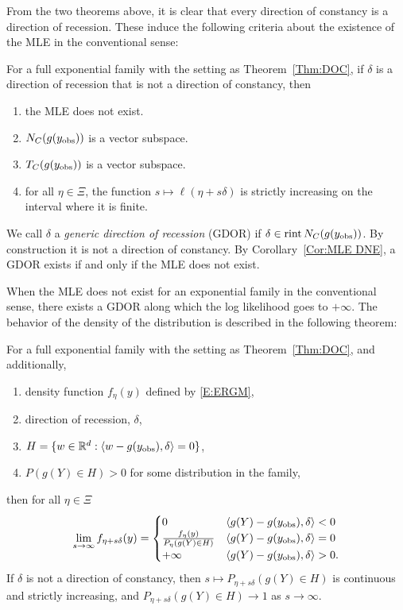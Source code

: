 From the two theorems above, it is clear that every direction of constancy is a 
direction of recession.  These induce the following criteria about the existence of 
the MLE in the conventional sense:

\begin{corollary} \label{Cor:MLE DNE}
For a full exponential family with the setting as Theorem~\ref{Thm:DOC}, if $\delta$ 
is a 
direction of recession that is not a direction of constancy, then  
\begin{enumerate}
\item the MLE does not exist.
\item $N_C(g(y_{\textrm{obs}}))$ is a vector subspace.
\item $T_C(g(y_{\textrm{obs}}))$ is a vector subspace.
\item for all $\eta \in \Xi$, the function $s \mapsto \ell(\eta + s \delta)$ is 
strictly increasing on 
the interval where it is finite.
\end{enumerate}
\end{corollary}

We call $\delta$ a \emph{generic direction of recession} 
(GDOR) if $\delta \in \operatorname{rint} N_C(g(y_{\textrm{obs}}))$.  By construction it is not a direction of 
constancy.  By Corollary~\ref{Cor:MLE DNE}, a GDOR exists if and only if the MLE does 
not exist.


When the MLE does not exist for an exponential family in the conventional sense, there 
exists a GDOR along which the log likelihood goes to $+\infty$.  The behavior of the 
density of the distribution is described in the following theorem:

\begin{theorem} \label{Thm:LCM}
For a full exponential family with the setting as Theorem~\ref{Thm:DOC}, and 
additionally,
\begin{enumerate}
\item density function $f_{\eta}(y)$ defined by \eqref{E:ERGM},
\item direction of recession, $\delta$,
\item $H = \{ w \in {\mathbb R}^d: \langle  w-g(y_{\textrm{obs}}), \delta  \rangle = 0 \}$,
\item $P( g(Y) \in H) > 0$ for some distribution in the family,
\end{enumerate}
then for all $\eta \in \Xi$
\begin{align} \label{E:LCM}
\lim_{s \to \infty} f_{\eta+s\delta}(y) = 
			\begin{cases} 
			0 								& \langle g(Y) - g(y_{\textrm{obs}}), \delta \rangle < 0 \\
			\frac{f_\eta(y)}{P_\eta(g(Y) \in H)} 	& \langle g(Y) - g(y_{\textrm{obs}}),
\delta \rangle = 0 \\
			+\infty							& \langle g(Y) - g(y_{\textrm{obs}}), \delta \rangle > 0.
		\end{cases}
\end{align}
If $\delta$ is not a direction of constancy, then $s \mapsto P_{\eta+s\delta}( g(Y) 
\in H)$ is continuous and strictly increasing, and 
$P_{\eta+s\delta}( g(Y) \in H) \to 
1$ as $s \to \infty$.
\end{theorem}


